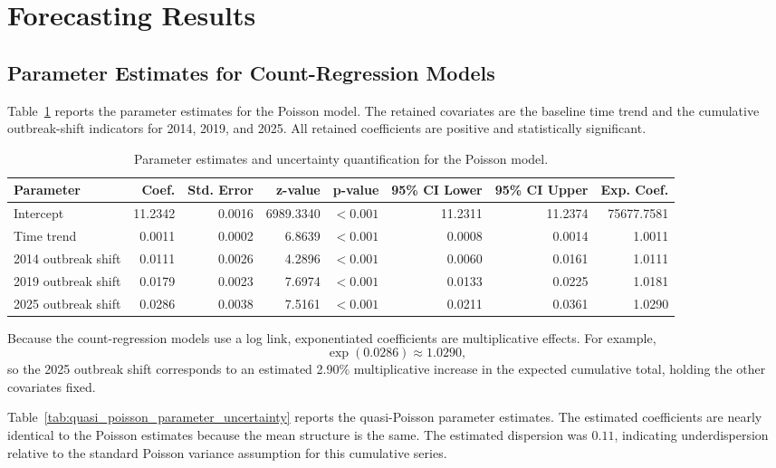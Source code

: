 \documentclass[utf8]{FrontiersinHarvard} %
\begin{document}
\section{Forecasting Results}\label{ResultD}
\subsection{Parameter Estimates for Count-Regression Models}
Table~\ref{tab:poisson_parameter_uncertainty} reports the parameter estimates for the Poisson model. The retained covariates are the baseline time trend and the cumulative outbreak-shift indicators for 2014, 2019, and 2025. All retained coefficients are positive and statistically significant.
\begin{table}[h!]
\centering
\caption{Parameter estimates and uncertainty quantification for the Poisson model.}
\label{tab:poisson_parameter_uncertainty}
\tiny
\begin{tabular}{lrrrrrrr}
\toprule
Parameter & Coef. & Std. Error & z-value & p-value & 95\% CI Lower & 95\% CI Upper & Exp. Coef. \\
\midrule
Intercept & 11.2342 & 0.0016 & 6989.3340 & $<0.001$ & 11.2311 & 11.2374 & 75677.7581 \\ 
Time trend & 0.0011 & 0.0002 & 6.8639 & $<0.001$ & 0.0008 & 0.0014 & 1.0011 \\
2014 outbreak shift & 0.0111 & 0.0026 & 4.2896 & $<0.001$ & 0.0060 & 0.0161 & 1.0111 \\
2019 outbreak shift & 0.0179 & 0.0023 & 7.6974 & $<0.001$ & 0.0133 & 0.0225 & 1.0181 \\
2025 outbreak shift & 0.0286 & 0.0038 & 7.5161 & $<0.001$ & 0.0211 & 0.0361 & 1.0290 \\
\bottomrule
\end{tabular}
\end{table}

Because the count-regression models use a log link, exponentiated coefficients are multiplicative effects. For example,
\[
\exp(0.0286)\approx 1.0290,
\]
so the 2025 outbreak shift corresponds to an estimated 2.90\% multiplicative increase in the expected cumulative total, holding the other covariates fixed.

Table~\ref{tab:quasi_poisson_parameter_uncertainty} reports the quasi-Poisson parameter estimates. The estimated coefficients are nearly identical to the Poisson estimates because the mean structure is the same. The estimated dispersion was \(0.11\), indicating underdispersion relative to the standard Poisson variance assumption for this cumulative series.
\end{document}
